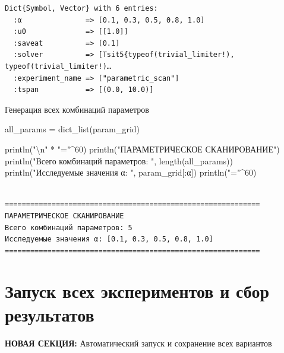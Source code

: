 \documentclass[
  12pt,
  a4paper,
  DIV=11,
  numbers=noendperiod]{scrreprt}
\newenvironment{Shaded}{\begin{snugshade}}{\end{snugshade}}
\newcommand{\FloatTok}[1]{\textcolor[rgb]{0.68,0.00,0.00}{#1}}
\newcommand{\FunctionTok}[1]{\textcolor[rgb]{0.28,0.35,0.67}{#1}}
\newcommand{\NormalTok}[1]{\textcolor[rgb]{0.00,0.23,0.31}{#1}}
\newcommand{\OperatorTok}[1]{\textcolor[rgb]{0.37,0.37,0.37}{#1}}
\newcommand{\SpecialCharTok}[1]{\textcolor[rgb]{0.37,0.37,0.37}{#1}}
\newcommand{\StringTok}[1]{\textcolor[rgb]{0.13,0.47,0.30}{#1}}
\begin{document}
\begin{verbatim}
Dict{Symbol, Vector} with 6 entries:
  :α               => [0.1, 0.3, 0.5, 0.8, 1.0]
  :u0              => [[1.0]]
  :saveat          => [0.1]
  :solver          => [Tsit5{typeof(trivial_limiter!), typeof(trivial_limiter!)…
  :experiment_name => ["parametric_scan"]
  :tspan           => [(0.0, 10.0)]
\end{verbatim}

Генерация всех комбинаций параметров

\begin{Shaded}
\begin{Highlighting}[]
\NormalTok{all\_params }\OperatorTok{=} \FunctionTok{dict\_list}\NormalTok{(param\_grid)}

\FunctionTok{println}\NormalTok{(}\StringTok{"}\SpecialCharTok{\textbackslash{}n}\StringTok{"} \OperatorTok{*} \StringTok{"="}\OperatorTok{\^{}}\FloatTok{60}\NormalTok{)}
\FunctionTok{println}\NormalTok{(}\StringTok{"ПАРАМЕТРИЧЕСКОЕ СКАНИРОВАНИЕ"}\NormalTok{)}
\FunctionTok{println}\NormalTok{(}\StringTok{"Всего комбинаций параметров: "}\NormalTok{, }\FunctionTok{length}\NormalTok{(all\_params))}
\FunctionTok{println}\NormalTok{(}\StringTok{"Исследуемые значения α: "}\NormalTok{, param\_grid[}\OperatorTok{:}\NormalTok{α])}
\FunctionTok{println}\NormalTok{(}\StringTok{"="}\OperatorTok{\^{}}\FloatTok{60}\NormalTok{)}
\end{Highlighting}
\end{Shaded}

\begin{verbatim}

============================================================
ПАРАМЕТРИЧЕСКОЕ СКАНИРОВАНИЕ
Всего комбинаций параметров: 5
Исследуемые значения α: [0.1, 0.3, 0.5, 0.8, 1.0]
============================================================
\end{verbatim}

\section{Запуск всех экспериментов и сбор
результатов}\label{ux437ux430ux43fux443ux441ux43a-ux432ux441ux435ux445-ux44dux43aux441ux43fux435ux440ux438ux43cux435ux43dux442ux43eux432-ux438-ux441ux431ux43eux440-ux440ux435ux437ux443ux43bux44cux442ux430ux442ux43eux432}

\textbf{НОВАЯ СЕКЦИЯ:} Автоматический запуск и сохранение всех вариантов
\end{document}
